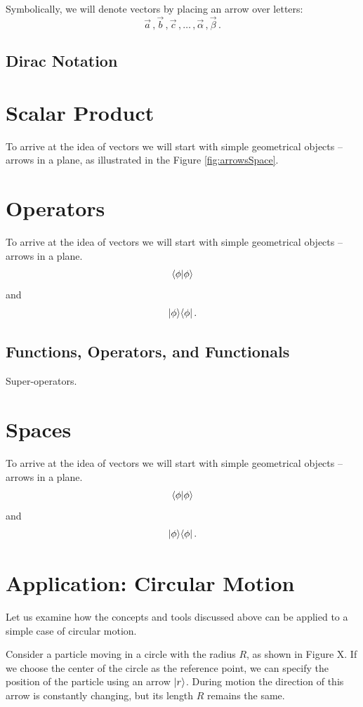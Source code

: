 Symbolically, we will denote vectors by placing an arrow over letters:
\[
\vec{a}\,,\vec{b}\,,\vec{c}\,,\ldots\,,\vec{\alpha}\,,\vec{\beta}\,.
\]

\subsection{Dirac Notation}

\section{Scalar Product}

To arrive at the idea of vectors we will start with simple geometrical
objects -- arrows in a plane, as illustrated in the Figure \ref{fig:arrowsSpace}.

\section{Operators}

To arrive at the idea of vectors we will start with simple geometrical
objects -- arrows in a plane.
\[
\langle{\phi}|{\phi\rangle}
\]
and
\[
|{\phi}\rangle\langle{\phi}|\,.
\]
\subsection{Functions, Operators, and Functionals}
Super-operators.

\section{Spaces}

To arrive at the idea of vectors we will start with simple geometrical
objects -- arrows in a plane.
\[
\langle{\phi}|{\phi\rangle}
\]
and
\[
|{\phi}\rangle\langle{\phi}|\,.
\]

\section{Application: Circular Motion}
Let us examine how the concepts and tools discussed above can be applied to a simple case of circular motion.  

Consider a  particle moving in a circle with the radius $R$, as shown in Figure X. If we choose the center of the circle as the reference point, we can specify the position of the particle using an arrow $|{r}\rangle$. During motion the direction of this arrow is constantly changing, but its length $R$ remains the same.  

